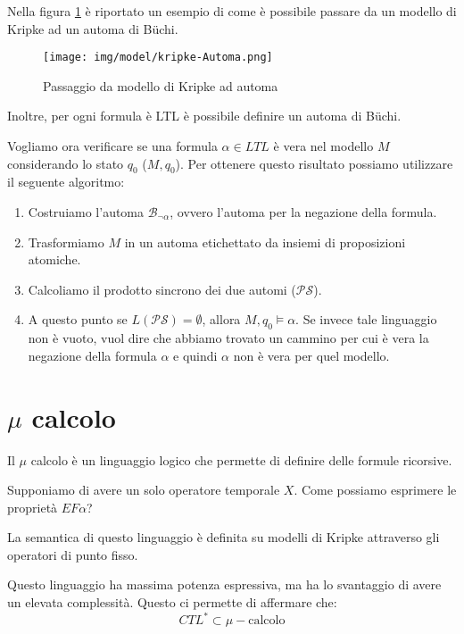 \begin{esempio}
    Nella figura \ref{fig:kripke-automa} è riportato un esempio di come è
    possibile passare da un modello di Kripke ad un automa di Büchi.
    \begin{figure}
        \centering
        \texttt{[image: img/model/kripke-Automa.png]}
        \caption{Passaggio da modello di Kripke ad automa}
        \label{fig:kripke-automa}
    \end{figure}
\end{esempio}
Inoltre, per ogni formula è LTL è possibile definire un automa di Büchi.

Vogliamo ora verificare se una formula $\alpha \in LTL$ è vera nel modello $M$
considerando lo stato $q_0$ ($M, q_0$). Per ottenere questo risultato possiamo
utilizzare il seguente algoritmo:
\begin{enumerate}
    \item Costruiamo l'automa $\mathcal{B}_{\lnot \alpha}$, ovvero l'automa per
          la negazione della formula.
    \item Trasformiamo $M$ in un automa etichettato da insiemi di proposizioni
          atomiche.
    \item Calcoliamo il prodotto sincrono dei due automi ($\mathcal{PS}$).
    \item A questo punto se $L(\mathcal{PS}) = \emptyset$, allora $M, q_0 \models
              \alpha$. Se invece tale linguaggio non è vuoto, vuol dire che
          abbiamo trovato un cammino per cui è vera la negazione della formula
          $\alpha$ e quindi $\alpha$ non è vera per quel modello.
\end{enumerate}
\section{$\mu$ calcolo}
Il $\mu$ calcolo è un linguaggio logico che permette di definire delle formule
ricorsive.
\begin{esempio}
    Supponiamo di avere un solo operatore temporale $X$. Come possiamo esprimere
    le proprietà $EF \alpha$?
\end{esempio}
La semantica di questo linguaggio è definita su modelli di Kripke attraverso
gli operatori di punto fisso.

Questo linguaggio ha massima potenza espressiva, ma ha lo svantaggio di avere
un elevata complessità. Questo ci permette di affermare che:
\begin{equation}
    CTL^{\ast} \subset \mu-\text{calcolo}
\end{equation}
